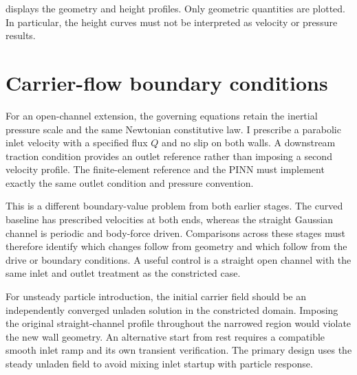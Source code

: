  displays the geometry and height profiles.
Only geometric quantities are plotted. In particular, the height curves
must not be interpreted as velocity or pressure results.


\section{Carrier-flow boundary conditions}
For an open-channel extension, the governing equations retain the inertial
pressure scale and the same Newtonian constitutive law. I prescribe a
parabolic inlet velocity with a specified flux $Q$ and no slip on both
walls. A downstream traction condition provides an outlet reference rather
than imposing a second velocity profile. The finite-element reference and
the PINN must implement exactly the same outlet condition and pressure
convention.

This is a different boundary-value problem from both earlier stages.
The curved baseline has prescribed velocities at both ends, whereas the
straight Gaussian channel is periodic and body-force driven. Comparisons
across these stages must therefore identify which changes follow from
geometry and which follow from the drive or boundary conditions. A useful
control is a straight open channel with the same inlet and outlet treatment
as the constricted case.

For unsteady particle introduction, the initial carrier field should be an
independently converged unladen solution in the constricted domain.
Imposing the original straight-channel profile throughout the narrowed
region would violate the new wall geometry. An alternative start from rest
requires a compatible smooth inlet ramp and its own transient verification.
The primary design uses the steady unladen field to avoid mixing inlet
startup with particle response.

